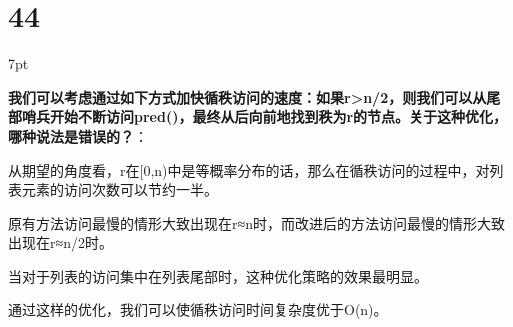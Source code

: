 \documentclass[UTF8]{report}
\theoremstyle{MyLineTheoremStyle} %
\theoremstyle{MyBlockTheoremStyle} %
\theoremstyle{MySubsubsectionStyle} %
\newenvironment{graybox}{%
        \def\FrameCommand{%
        \hspace{1pt}%
        {\color{gray}\small \vrule width 2pt}%
        {\color{graybox_color}\vrule width 4pt}%
        \colorbox{graybox_color}%
        }%
        \MakeFramed{\advance\hsize-\width\FrameRestore}%
        \noindent\hspace{-4.55pt}%
        \begin{adjustwidth}{}{7pt}%
        \vspace{2pt}\vspace{2pt}%
        }
        {%
        \vspace{2pt}\end{adjustwidth}\endMakeFramed%
        }
\begin{document}
\section*{44}

\begin{graybox}
\textbf{我们可以考虑通过如下方式加快循秩访问的速度：如果r>n/2，则我们可以从尾部哨兵开始不断访问pred()，最终从后向前地找到秩为r的节点。关于这种优化，哪种说法是错误的？}：
\begin{circledenum}
    \item 从期望的角度看，r在[0,n)中是等概率分布的话，那么在循秩访问的过程中，对列表元素的访问次数可以节约一半。
    \item 原有方法访问最慢的情形大致出现在r≈n时，而改进后的方法访问最慢的情形大致出现在r≈n/2时。
    \item 当对于列表的访问集中在列表尾部时，这种优化策略的效果最明显。
    \item 通过这样的优化，我们可以使循秩访问时间复杂度优于O(n)。
\end{circledenum}
\end{graybox}
\end{document}
